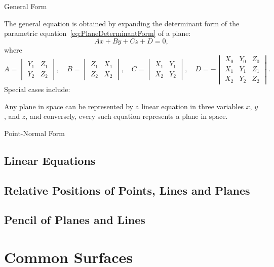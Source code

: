 \documentclass[11pt]{../../TexTemplate/elegantbook} %
\begin{document}
\begin{leftbarTitle}{General Form}\end{leftbarTitle}
The general equation is obtained by expanding the determinant form of 
the parametric equation~\ref{eq:PlaneDeterminantForm} of a plane:
\[
Ax + By + Cz + D = 0,
\]
where
\[
A = \begin{vmatrix} Y_{1} & Z_{1} \\ Y_{2} & Z_{2} \end{vmatrix}, \quad
B = \begin{vmatrix} Z_{1} & X_{1} \\ Z_{2} & X_{2} \end{vmatrix}, \quad
C = \begin{vmatrix} X_{1} & Y_{1} \\ X_{2} & Y_{2} \end{vmatrix}, \quad
D = -\begin{vmatrix} X_{0} & Y_{0} & Z_{0} \\ X_{1} & Y_{1} & Z_{1} \\ X_{2} & Y_{2} & Z_{2} \end{vmatrix}.
\]
Special cases include:

\begin{theorem}
    Any plane in space can be represented by a linear equation in three variables \(x\), \(y\), and \(z\), 
    and conversely, every such equation represents a plane in space.
\end{theorem}

\begin{leftbarTitle}{Point-Normal Form}\end{leftbarTitle}

\section{Linear Equations}

\section{Relative Positions of Points, Lines and Planes}

\section{Pencil of Planes and Lines}

\chapter{Common Surfaces}
\end{document}
